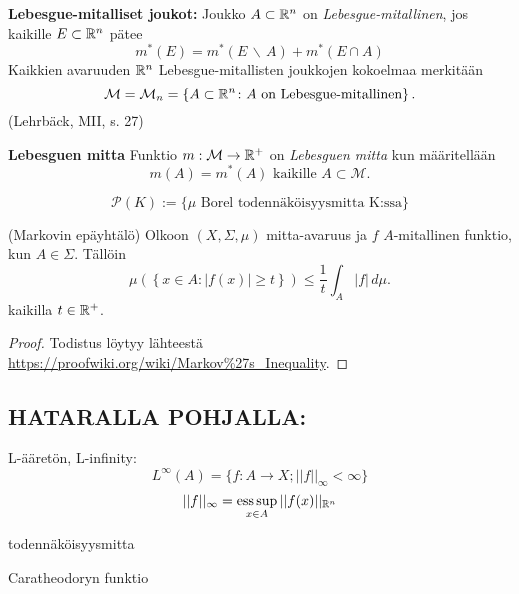 \begin{definition}
    \textbf{Lebesgue-mitalliset joukot:} Joukko $A\subset \mathbb{R}^n$ on \textit{Lebesgue-mitallinen}, jos kaikille $E\subset \mathbb{R}^n$ pätee
    $$m^*(E) = m^*(E \, \backslash \, A) + m^*(E\cap A)$$
    Kaikkien avaruuden $\mathbb{R}^n$ Lebesgue-mitallisten joukkojen kokoelmaa merkitään 
    $$\mathcal M = \mathcal M_n = \left\{A\subset \mathbb{R}^n \colon A \text{ on Lebesgue-mitallinen} \right\}.$$
    (Lehrbäck, MII, s. 27)
\end{definition}

\begin{definition}
    \textbf{Lebesguen mitta} Funktio $m : \mathcal M \to \mathbb{R}^+$ on \textit{Lebesguen mitta} kun määritellään
    $$m(A) = m^*(A) \text{ kaikille } A\subset \mathcal M.$$
\end{definition}

\begin{definition}
    $$\mathcal P(K) := \{\mu \text{ Borel todennäköisyysmitta K:ssa}\}$$
\end{definition}

\begin{theorem}\label{thm:markov}
    (Markovin epäyhtälö) Olkoon $(X, \Sigma, \mu)$ mitta-avaruus ja $f$ $A$-mitallinen funktio, kun $A \in \Sigma$. Tällöin
    \begin{equation*}
        \mu(\left\{x \in A : |f(x)| \ge t\right\}) \le \frac{1}{t}\int_A |f| \, d\mu.
    \end{equation*}
    kaikilla $t\in {\mathbb{R}^{+}}$.
\end{theorem}
\begin{proof}
    Todistus löytyy lähteestä \url{https://proofwiki.org/wiki/Markov%27s_Inequality}.
\end{proof}

\subsection{HATARALLA POHJALLA:}
\begin{definition}
L-ääretön, L-infinity:
    \[L^\infty (A) = \{f:A\to X ;  ||f||_\infty < \infty\}\] 
    \[||f||_\infty = \operatorname*{ess\, sup}_{x\in A} ||f(x)||_{\mathbb{R}^n}\]
\end{definition}



\begin{definition}
    todennäköisyysmitta
\end{definition}


\begin{definition}
    Caratheodoryn funktio
\end{definition}





